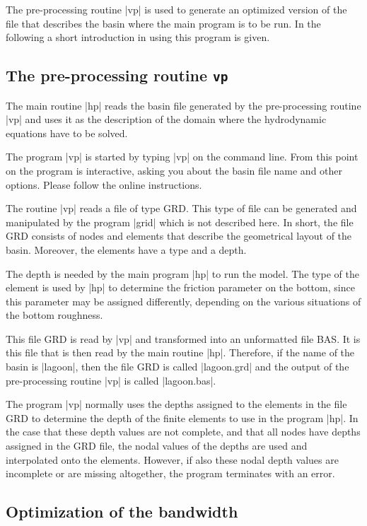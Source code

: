 



The pre-processing routine |vp| is used to generate an
optimized version of the file that describes the basin
where the main program is to be run. In the following a
short introduction in using this program is given.

\subsection{The pre-processing routine {\tt vp}}

The main routine |hp| reads the basin file generated by
the pre-processing routine |vp| and uses it as the description
of the domain where the hydrodynamic equations have to be
solved.

The program |vp| is started by typing |vp| on the command line.
From this point on the program is interactive, asking you about
the basin file name and other options. Please follow the online
instructions.

The routine |vp| reads a file of type GRD. This type of file
can be generated and manipulated by the program |grid| which
is not described here. In short, the file GRD consists of
nodes and elements that describe the geometrical layout
of the basin. Moreover, the elements have a type and a depth.

The depth is needed by the main program |hp| to run the model.
The type of the element is used by |hp| to determine
the friction parameter on the bottom, since this parameter
may be assigned differently, depending on the various situations
of the bottom roughness.

This file GRD is read by |vp| and transformed into an
unformatted file BAS. It is this file that is then read
by the main routine |hp|. Therefore, if the name of the
basin is |lagoon|, then the file GRD is called |lagoon.grd|
and the output of the pre-processing routine |vp| is
called |lagoon.bas|.

The program |vp| normally uses the depths assigned to the
elements in the file GRD to determine the depth of the
finite elements to use in the program |hp|. In the case
that these depth values are not complete, and that all nodes
have depths assigned in the GRD file, the nodal values of the
depths are used and interpolated onto the elements. However,
if also these nodal depth values are incomplete or are missing
altogether, the program terminates with an error.

\subsection{Optimization of the bandwidth}

